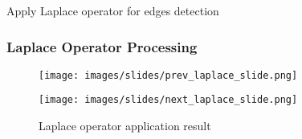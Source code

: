 \begin{frame}

  Apply Laplace operator for edges detection

  \frametitle{Laplace Operator Processing}
  \begin{figure}[ht]
    \begin{minipage}[a]{0.7\linewidth}
        \centering
        \texttt{[image: images/slides/prev\_laplace\_slide.png]}
    \end{minipage}
    \hspace{0.5cm}
    \begin{minipage}[b]{0.7\linewidth}
        \centering
        \texttt{[image: images/slides/next\_laplace\_slide.png]}
    \end{minipage}
    \caption{Laplace operator application result}
\end{figure}
\end{frame}
